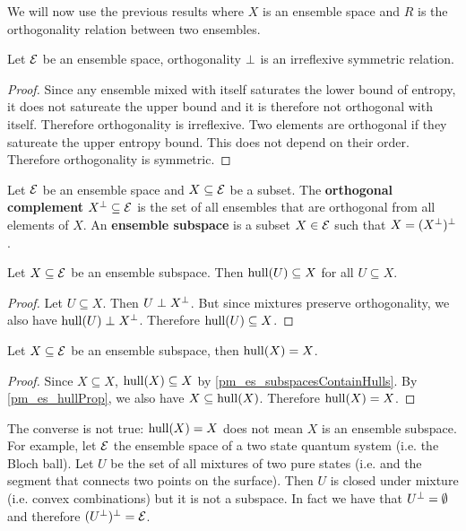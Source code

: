 We will now use the previous results where $X$ is an ensemble space and $R$ is the orthogonality relation between two ensembles.

\begin{prop}
	Let $\mathcal{E}$ be an ensemble space, orthogonality $\perp$ is an irreflexive symmetric relation.
\end{prop}

\begin{proof}
	Since any ensemble mixed with itself saturates the lower bound of entropy, it does not satureate the upper bound and it is therefore not orthogonal with itself. Therefore orthogonality is irreflexive. Two elements are orthogonal if they satureate the upper entropy bound. This does not depend on their order. Therefore orthogonality is symmetric.
\end{proof}

\begin{defn}
	Let $\mathcal{E}$ be an ensemble space and $X \subseteq \mathcal{E}$ be a subset. The \textbf{orthogonal complement} $X^\perp \subseteq \mathcal{E}$ is the set of all ensembles that are orthogonal from all elements of $X$. An \textbf{ensemble subspace} is a subset $X \in \mathcal{E}$ such that $X = (X^\perp)^\perp$.
\end{defn}

\begin{prop}\label{pm_es_subspacesContainHulls}
	Let $X \subseteq \mathcal{E}$ be an ensemble subspace. Then $\mathrm{hull}(U) \subseteq X$ for all $U \subseteq X$.
\end{prop}

\begin{proof}
	Let $U \subseteq X$. Then $U \perp X^{\perp}$. But since mixtures preserve orthogonality, we also have $\mathrm{hull}(U) \perp X^{\perp}$. Therefore $\mathrm{hull}(U) \subseteq X$.
\end{proof}

\begin{coro}
	Let $X \subseteq \mathcal{E}$ be an ensemble subspace, then $\mathrm{hull}(X) = X$.
\end{coro}

\begin{proof}
	Since $X \subseteq X$, $\mathrm{hull}(X) \subseteq X$ by \ref{pm_es_subspacesContainHulls}. By \ref{pm_es_hullProp}, we also have $X \subseteq \mathrm{hull}(X)$. Therefore $\mathrm{hull}(X) = X$.
\end{proof}

\begin{remark}
	The converse is not true: $\mathrm{hull}(X) = X$ does not mean $X$ is an ensemble subspace. For example, let $\mathcal{E}$ the ensemble space of a two state quantum system (i.e. the Bloch ball). Let $U$ be the set of all mixtures of two pure states (i.e. and the segment that connects two points on the surface). Then $U$ is closed under mixture (i.e. convex combinations) but it is not a subspace. In fact we have that $U^{\perp}=\emptyset$ and therefore $(U^\perp)^\perp = \mathcal{E}$.
\end{remark}

